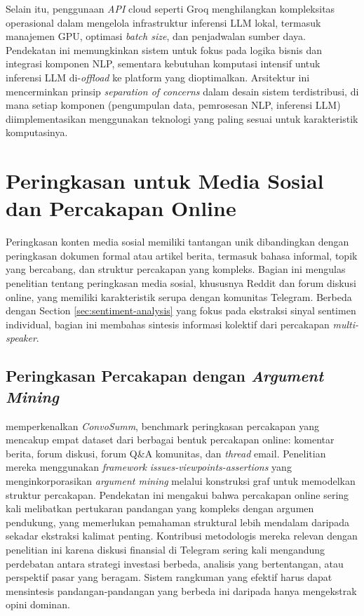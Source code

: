 Selain itu, penggunaan \textit{API} cloud seperti Groq menghilangkan kompleksitas operasional dalam mengelola infrastruktur inferensi LLM lokal, termasuk manajemen GPU, optimasi \textit{batch size}, dan penjadwalan sumber daya. Pendekatan ini memungkinkan sistem untuk fokus pada logika bisnis dan integrasi komponen NLP, sementara kebutuhan komputasi intensif untuk inferensi LLM di-\textit{offload} ke platform yang dioptimalkan. Arsitektur ini mencerminkan prinsip \textit{separation of concerns} dalam desain sistem terdistribusi, di mana setiap komponen (pengumpulan data, pemrosesan NLP, inferensi LLM) diimplementasikan menggunakan teknologi yang paling sesuai untuk karakteristik komputasinya.

\section{Peringkasan untuk Media Sosial dan Percakapan Online}
\label{sec:social-media-summarization}

Peringkasan konten media sosial memiliki tantangan unik dibandingkan dengan peringkasan dokumen formal atau artikel berita, termasuk bahasa informal, topik yang bercabang, dan struktur percakapan yang kompleks. Bagian ini mengulas penelitian tentang peringkasan media sosial, khususnya Reddit dan forum diskusi online, yang memiliki karakteristik serupa dengan komunitas Telegram. Berbeda dengan Section \ref{sec:sentiment-analysis} yang fokus pada ekstraksi sinyal sentimen individual, bagian ini membahas sintesis informasi kolektif dari percakapan \textit{multi-speaker}.

\subsection{Peringkasan Percakapan dengan \textit{Argument Mining}}

\textcite{fabbri2021} memperkenalkan \textit{ConvoSumm}, benchmark peringkasan percakapan yang mencakup empat dataset dari berbagai bentuk percakapan online: komentar berita, forum diskusi, forum Q\&A komunitas, dan \textit{thread} email. Penelitian mereka menggunakan \textit{framework} \textit{issues-viewpoints-assertions} yang menginkorporasikan \textit{argument mining} melalui konstruksi graf untuk memodelkan struktur percakapan. Pendekatan ini mengakui bahwa percakapan online sering kali melibatkan pertukaran pandangan yang kompleks dengan argumen pendukung, yang memerlukan pemahaman struktural lebih mendalam daripada sekadar ekstraksi kalimat penting. Kontribusi metodologis mereka relevan dengan penelitian ini karena diskusi finansial di Telegram sering kali mengandung perdebatan antara strategi investasi berbeda, analisis yang bertentangan, atau perspektif pasar yang beragam. Sistem rangkuman yang efektif harus dapat mensintesis pandangan-pandangan yang berbeda ini daripada hanya mengekstrak opini dominan.

